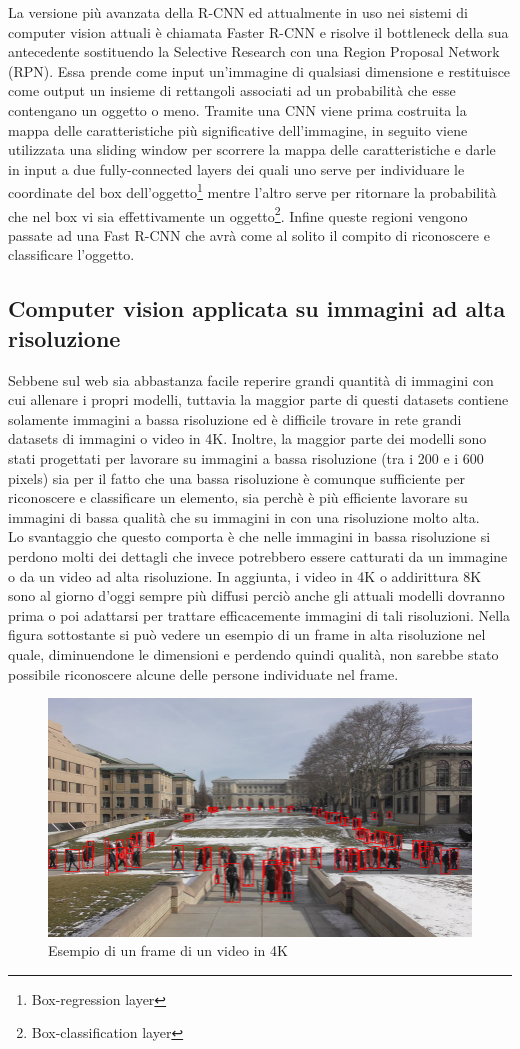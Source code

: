 La versione più avanzata della R-CNN ed attualmente in uso nei sistemi di computer vision attuali è chiamata Faster R-CNN e risolve il bottleneck della sua antecedente sostituendo la Selective Research con una Region Proposal Network (RPN). Essa prende come input un'immagine di qualsiasi dimensione e restituisce come output un insieme di rettangoli associati ad un probabilità che esse contengano un oggetto o meno. Tramite una CNN viene prima costruita la mappa delle caratteristiche più significative dell'immagine, in seguito viene utilizzata una sliding window per scorrere la mappa delle caratteristiche e darle in input a due fully-connected layers dei quali uno serve per individuare le coordinate del box dell'oggetto\footnote{Box-regression layer} mentre l'altro serve per ritornare la probabilità che nel box vi sia effettivamente un oggetto\footnote{Box-classification layer}. Infine queste regioni vengono passate ad una Fast R-CNN che avrà come al solito il compito di riconoscere e classificare l'oggetto.
\subsection{Computer vision applicata su immagini ad alta risoluzione}
Sebbene sul web sia abbastanza facile reperire grandi quantità di immagini con cui allenare i propri modelli, tuttavia la maggior parte di questi datasets contiene solamente immagini a bassa risoluzione ed è difficile trovare in rete grandi datasets di immagini o video in 4K. Inoltre, la maggior parte dei modelli sono stati progettati per lavorare su immagini a bassa risoluzione (tra i 200 e i 600 pixels) sia per il fatto che una bassa risoluzione è comunque sufficiente per riconoscere e classificare un elemento, sia perchè è più efficiente lavorare su immagini di bassa qualità che su immagini in con una risoluzione molto alta.\\
Lo svantaggio che questo comporta è che nelle immagini in bassa risoluzione si perdono molti dei dettagli che invece potrebbero essere catturati da un immagine o da un video ad alta risoluzione. In aggiunta, i video in 4K o addirittura 8K sono al giorno d'oggi sempre più diffusi perciò anche gli attuali modelli dovranno prima o poi adattarsi per trattare efficacemente immagini di tali risoluzioni. Nella figura sottostante si può vedere un esempio di un frame in alta risoluzione nel quale, diminuendone le dimensioni e perdendo quindi qualità, non sarebbe stato possibile riconoscere alcune delle persone individuate nel frame.
\begin{figure}[H]
	\centering
	\includegraphics[width=0.7\linewidth]{images/Esempio-4K-video-frame.png}
	\caption{Esempio di un frame di un video in 4K}
	\label{Esempio di un frame di un video in 4K}
\end{figure}
